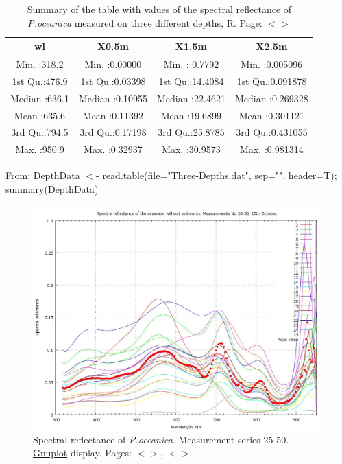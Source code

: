 \documentclass[11pt]{article}
\begin{document}
\begin{appendices}
\begin{table}[H]
\end{table}
\pagebreak

\begin{table}[htbp]
	\caption{Summary of the table with values of the spectral reflectance of \textit{P.oceanica} measured on three different depths, R. Page: $<$\pageref{page-28}$>$}
	\begin{center}
	\begin{tabular}{|c|c|c|c|}
		\hline\hline
		wl & X0.5m & X1.5m & X2.5m\\ \hline\hline
		Min.   :318.2   &  Min.   :0.00000     &   Min.   : 0.7792     &   Min.   :0.005096  \\ \hline
		 1st Qu.:476.9   &  1st Qu.:0.03398    &  1st Qu.:14.4084    &  1st Qu.:0.091878  \\ \hline
		 Median :636.1   &   Median :0.10955    &  Median :22.4621   &  Median :0.269328 \\ \hline 
		 Mean   :635.6   &   Mean   :0.11392   &   Mean   :19.6899   &  Mean   :0.301121  \\ \hline
		 3rd Qu.:794.5   &   3rd Qu.:0.17198   &   3rd Qu.:25.8785    &  3rd Qu.:0.431055 \\ \hline  
		 Max.   :950.9     &  Max.   :0.32937    &  Max.   :30.9573   &   Max.   :0.981314  \\ \hline
	\end{tabular}
	\end{center}
		From: DepthData $<$- read.table(file="Three-Depths.dat", sep="", header=T); summary(DepthData)
	\label{tab:17}
\end{table}

\begin{figure}[H]
	\begin{center}
		\includegraphics[scale=0.35]{GNU-11.jpg}
		\caption{Spectral reflectance of \textit{P.oceanica}. Measurement series 25-50. \\ \href{http://www.gnuplot.info/}{Gnuplot} display. Pages: $<$\pageref{page-21}$>$, $<$\pageref{dataprep}$>$­}
		\label{fig:A.25}
	\end{center}
\end{figure}
\pagebreak


\end{appendices}
\end{document}
